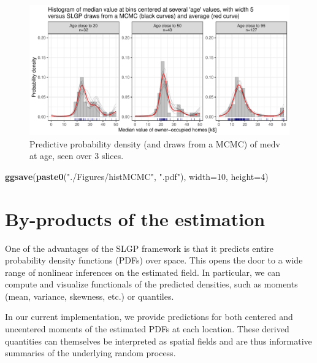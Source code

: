 \documentclass[
]{article}
\newenvironment{Shaded}{\begin{snugshade}}{\end{snugshade}}
\newcommand{\AttributeTok}[1]{\textcolor[rgb]{0.13,0.29,0.53}{#1}}
\newcommand{\DecValTok}[1]{\textcolor[rgb]{0.00,0.00,0.81}{#1}}
\newcommand{\FunctionTok}[1]{\textcolor[rgb]{0.13,0.29,0.53}{\textbf{#1}}}
\newcommand{\NormalTok}[1]{#1}
\newcommand{\StringTok}[1]{\textcolor[rgb]{0.31,0.60,0.02}{#1}}
\begin{document}
\begin{figure}[H]

{\centering \includegraphics{IntroductionSLGP_files/figure-latex/SLGPMCMCplot-1} 

}

\caption{Predictive probability density (and draws from a MCMC) of medv at age, seen over 3 slices.}\label{fig:SLGPMCMCplot}
\end{figure}

\begin{Shaded}
\begin{Highlighting}[]
\FunctionTok{ggsave}\NormalTok{(}\FunctionTok{paste0}\NormalTok{(}\StringTok{"./Figures/histMCMC"}\NormalTok{,  }\StringTok{".pdf"}\NormalTok{), }\AttributeTok{width=}\DecValTok{10}\NormalTok{, }\AttributeTok{height=}\DecValTok{4}\NormalTok{)}
\end{Highlighting}
\end{Shaded}

\section{By-products of the estimation}\label{by-products-of-the-estimation}

One of the advantages of the SLGP framework is that it predicts entire probability density functions (PDFs) over space. This opens the door to a wide range of nonlinear inferences on the estimated field. In particular, we can compute and visualize functionals of the predicted densities, such as moments (mean, variance, skewness, etc.) or quantiles.

In our current implementation, we provide predictions for both centered and uncentered moments of the estimated PDFs at each location. These derived quantities can themselves be interpreted as spatial fields and are thus informative summaries of the underlying random process.
\end{document}
